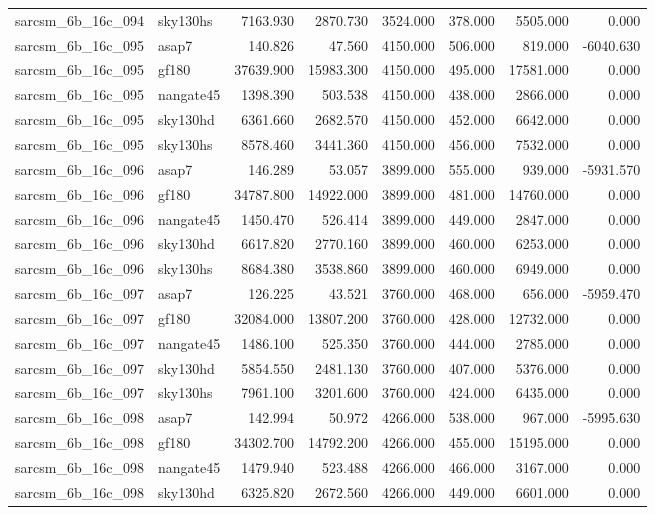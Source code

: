 \begin{tabular}{llrrrrrr}
sarcsm\_6b\_16c\_094 & sky130hs & 7163.930 & 2870.730 & 3524.000 & 378.000 & 5505.000 & 0.000 \\
sarcsm\_6b\_16c\_095 & asap7 & 140.826 & 47.560 & 4150.000 & 506.000 & 819.000 & -6040.630 \\
sarcsm\_6b\_16c\_095 & gf180 & 37639.900 & 15983.300 & 4150.000 & 495.000 & 17581.000 & 0.000 \\
sarcsm\_6b\_16c\_095 & nangate45 & 1398.390 & 503.538 & 4150.000 & 438.000 & 2866.000 & 0.000 \\
sarcsm\_6b\_16c\_095 & sky130hd & 6361.660 & 2682.570 & 4150.000 & 452.000 & 6642.000 & 0.000 \\
sarcsm\_6b\_16c\_095 & sky130hs & 8578.460 & 3441.360 & 4150.000 & 456.000 & 7532.000 & 0.000 \\
sarcsm\_6b\_16c\_096 & asap7 & 146.289 & 53.057 & 3899.000 & 555.000 & 939.000 & -5931.570 \\
sarcsm\_6b\_16c\_096 & gf180 & 34787.800 & 14922.000 & 3899.000 & 481.000 & 14760.000 & 0.000 \\
sarcsm\_6b\_16c\_096 & nangate45 & 1450.470 & 526.414 & 3899.000 & 449.000 & 2847.000 & 0.000 \\
sarcsm\_6b\_16c\_096 & sky130hd & 6617.820 & 2770.160 & 3899.000 & 460.000 & 6253.000 & 0.000 \\
sarcsm\_6b\_16c\_096 & sky130hs & 8684.380 & 3538.860 & 3899.000 & 460.000 & 6949.000 & 0.000 \\
sarcsm\_6b\_16c\_097 & asap7 & 126.225 & 43.521 & 3760.000 & 468.000 & 656.000 & -5959.470 \\
sarcsm\_6b\_16c\_097 & gf180 & 32084.000 & 13807.200 & 3760.000 & 428.000 & 12732.000 & 0.000 \\
sarcsm\_6b\_16c\_097 & nangate45 & 1486.100 & 525.350 & 3760.000 & 444.000 & 2785.000 & 0.000 \\
sarcsm\_6b\_16c\_097 & sky130hd & 5854.550 & 2481.130 & 3760.000 & 407.000 & 5376.000 & 0.000 \\
sarcsm\_6b\_16c\_097 & sky130hs & 7961.100 & 3201.600 & 3760.000 & 424.000 & 6435.000 & 0.000 \\
sarcsm\_6b\_16c\_098 & asap7 & 142.994 & 50.972 & 4266.000 & 538.000 & 967.000 & -5995.630 \\
sarcsm\_6b\_16c\_098 & gf180 & 34302.700 & 14792.200 & 4266.000 & 455.000 & 15195.000 & 0.000 \\
sarcsm\_6b\_16c\_098 & nangate45 & 1479.940 & 523.488 & 4266.000 & 466.000 & 3167.000 & 0.000 \\
sarcsm\_6b\_16c\_098 & sky130hd & 6325.820 & 2672.560 & 4266.000 & 449.000 & 6601.000 & 0.000 \\

\end{tabular}
